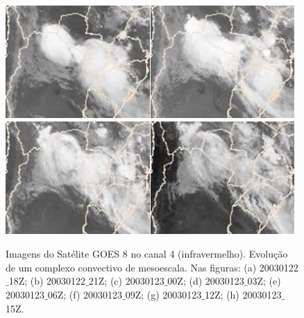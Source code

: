 \begin{figure}
\includegraphics[height=4.3cm]{./figs/sat05.png}\hspace{0.2cm}\includegraphics[height=4.3cm]{./figs/sat06.png}\hspace{0.2cm}\includegraphics[height=4.3cm]{./figs/sat07.png}\hspace{0.2cm}\includegraphics[height=4.3cm]{./figs/sat08.png}
\caption{Imagens do Satélite GOES 8 no canal 4 (infravermelho). Evolução de um complexo convectivo de mesoescala. Nas figuras: (a) 20030122$\_$18Z; (b) 20030122$\_$21Z; (c) 20030123$\_$00Z; (d) 20030123$\_$03Z; (e) 20030123$\_$06Z; (f) 20030123$\_$09Z; (g) 20030123$\_$12Z; (h) 20030123$\_$15Z.}
\label{fig14}
\end{figure}

